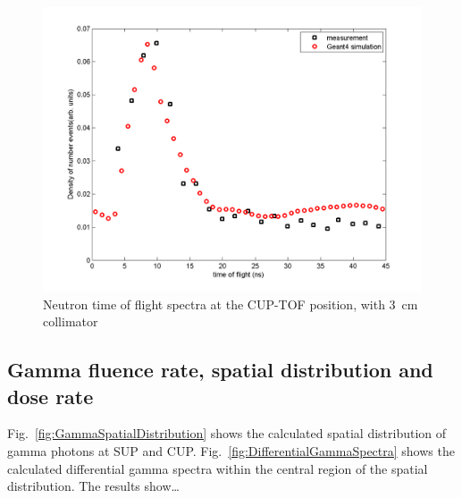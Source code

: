 \documentclass[11pt,a4paper]{IEEEtran}
\let\MYoriglatexcaption\caption
\renewcommand{\caption}[2][\relax]{\MYoriglatexcaption[#2]{#2}}
\begin{document}
\begin{figure}[t]
    \includegraphics[width=\columnwidth]{CUPTOFtofspectraRADECS.png}
    \caption{
        Neutron time of flight spectra at the CUP-TOF position, with \SI{3}{\cm} collimator
        }
    \label{fig:TOFSpectra}
\end{figure}

\subsection{Gamma fluence rate, spatial distribution and dose rate}
Fig.~\ref{fig:GammaSpatialDistribution} shows the calculated spatial distribution of gamma photons at SUP and CUP.
Fig.~\ref{fig:DifferentialGammaSpectra} shows the calculated differential gamma spectra within the central region of the spatial distribution.
The results show\ldots
{}
\end{document}
